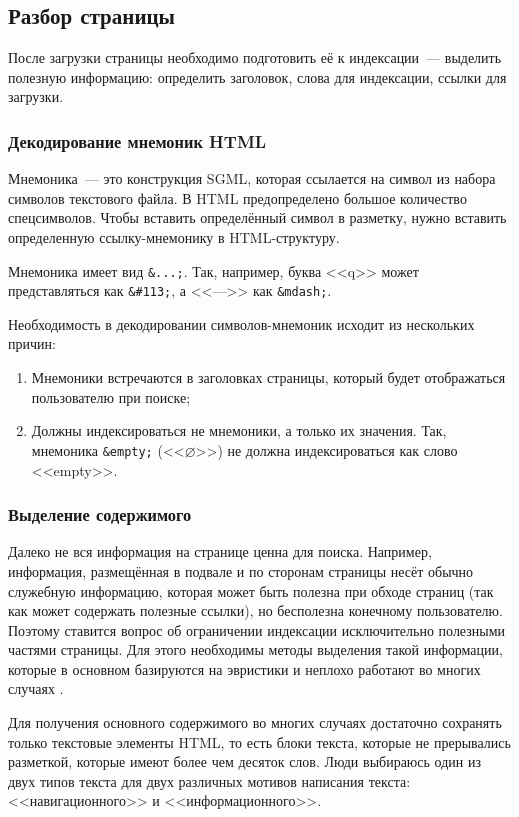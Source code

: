 \subsection{Разбор страницы}
После загрузки страницы необходимо подготовить её к индексации~--- выделить полезную информацию: определить заголовок, слова для индексации, ссылки для загрузки.


\subsubsection{Декодирование мнемоник HTML}
Мнемоника~--- это конструкция SGML, которая ссылается на символ из набора символов текстового файла. В HTML предопределено большое количество спецсимволов. Чтобы вставить определённый символ в разметку, нужно вставить определенную ссылку-мнемонику в HTML-структуру.

Мнемоника имеет вид \verb|&...;|. Так, например, буква <<q>> может представляться как \verb|&#113;|, а <<--->> как \verb|&mdash;|.

Необходимость в декодировании символов-мнемоник исходит из нескольких причин:
\begin{enumerate}
  \item Мнемоники встречаются в заголовках страницы, который будет отображаться пользователю при поиске;
  \item Должны индексироваться не мнемоники, а только их значения. Так, мнемоника \verb|&empty;| (<<$\varnothing$>>) не должна индексироваться как слово <<empty>>.
\end{enumerate}


\subsubsection{Выделение содержимого} \label{sssec:readability}
Далеко не вся информация на странице ценна для поиска. Например, информация, размещённая в подвале и по сторонам страницы несёт обычно служебную информацию, которая может быть полезна при обходе страниц (так как может содержать полезные ссылки), но бесполезна конечному пользователю. Поэтому ставится вопрос об ограничении индексации исключительно полезными частями страницы. Для этого необходимы методы выделения такой информации, которые в основном базируются на эвристики и неплохо работают во многих случаях \cite{pomikalek11}.

Для получения основного содержимого во многих случаях достаточно сохранять только текстовые элементы HTML, то есть блоки текста, которые не прерывались разметкой, которые имеют более чем десяток слов. Люди выбираюсь один из двух типов текста для двух различных мотивов написания текста: <<навигационного>> и <<информационного>>.

